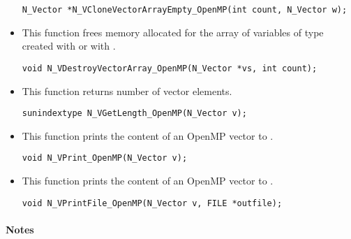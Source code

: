 \begin{itemize}
 

 \verb|N_Vector *N_VCloneVectorArrayEmpty_OpenMP(int count, N_Vector w);|


\item {}

 This function frees memory allocated for the array of  variables of type
  created with  or with
 .

 

 \verb|void N_VDestroyVectorArray_OpenMP(N_Vector *vs, int count);|


\item {}

 This function returns number of vector elements.

 
 
 \verb|sunindextype N_VGetLength_OpenMP(N_Vector v);|


\item {}

 This function prints the content of an OpenMP vector to .
 
 \verb|void N_VPrint_OpenMP(N_Vector v);|


\item {}

 This function prints the content of an OpenMP vector to .
 
 \verb|void N_VPrintFile_OpenMP(N_Vector v, FILE *outfile);|

\end{itemize}
\paragraph{\bf Notes}                                                      
           

